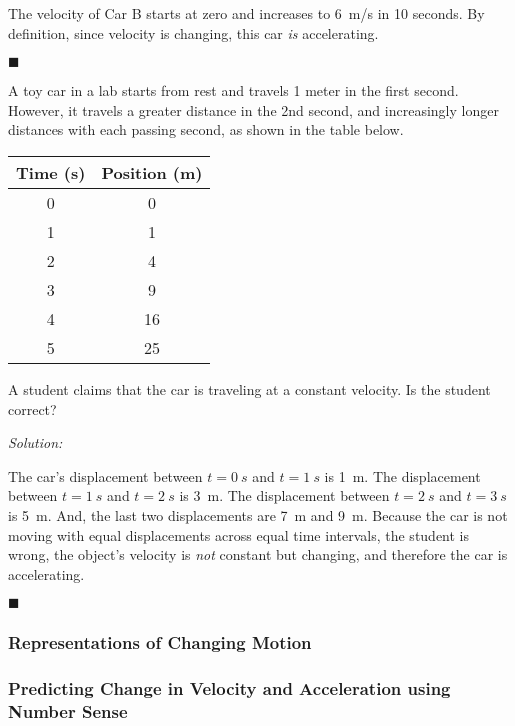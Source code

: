 \documentclass[dvipsnames]{article}
\begin{document}
The velocity of Car B starts at zero and increases to \SI{6}{m/s} in 10 seconds. By definition, since velocity is changing, this car \textit{is} accelerating.

\hfill $\blacksquare$

\begin{example}
A toy car in a lab starts from rest and travels 1 meter in the first second. However, it travels a greater distance in the 2nd second, and increasingly longer distances with each passing second, as shown in the table below.

\begin{center}
    \begin{tabular}{|c|c|}
        \hline
         \textbf{Time} (s) & \textbf{Position} (m) \\ \hline
         0 & 0 \\ \hline
         1 & 1 \\ \hline
         2 & 4 \\ \hline
         3 & 9 \\ \hline
         4 & 16 \\ \hline
         5 & 25 \\ \hline
    \end{tabular}
\end{center}

A student claims that the car is traveling at a constant velocity. Is the student correct?
\end{example}

\textit{Solution:}

The car's displacement between $t = \SI{0}{s}$ and $t = \SI{1}{s}$ is \SI{1}{m}. The displacement between $t = \SI{1}{s}$ and $t = \SI{2}{s}$ is \SI{3}{m}. The displacement between $t = \SI{2}{s}$ and $t = \SI{3}{s}$ is \SI{5}{m}. And, the last two displacements are \SI{7}{m} and \SI{9}{m}. Because the car is not moving with equal displacements across equal time intervals, the student is wrong, the object's velocity is \textit{not} constant but changing, and therefore the car is accelerating.

\hfill $\blacksquare$

\subsubsection{Representations of Changing Motion}

\subsubsection{Predicting Change in Velocity and Acceleration using Number Sense}
\end{document}
